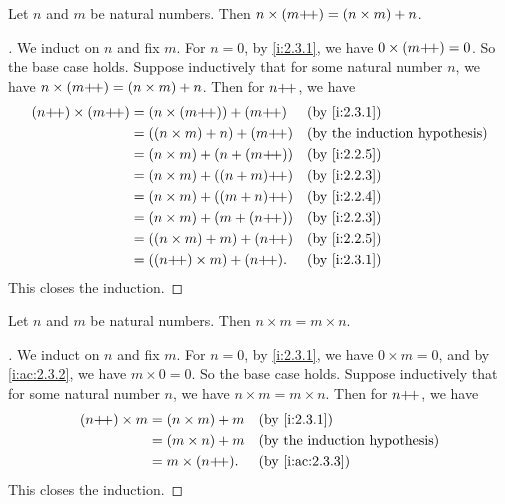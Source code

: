 \begin{ac}\label{i:ac:2.3.3}
  Let \(n\) and \(m\) be natural numbers.
  Then \(n \times (m{+}\!{+}) = (n \times m) + n\).
\end{ac}

\begin{proof}[]
  We induct on \(n\) and fix \(m\).
  For \(n = 0\), by \cref{i:2.3.1}, we have \(0 \times (m{+}\!{+}) = 0\).
  So the base case holds.
  Suppose inductively that for some natural number \(n\), we have \(n \times (m{+}\!{+}) = (n \times m) + n\).
  Then for \(n{+}\!{+}\), we have
  \begin{align*}
    (n\pp) \times (m\pp)
     & = (n \times (m\pp)) + (m\pp)  &  & \by{i:2.3.1} \\
     & = ((n \times m) + n) + (m\pp) &  & \byIH        \\
     & = (n \times m) + (n + (m\pp)) &  & \by{i:2.2.5} \\
     & = (n \times m) + ((n + m)\pp) &  & \by{i:2.2.3} \\
     & = (n \times m) + ((m + n)\pp) &  & \by{i:2.2.4} \\
     & = (n \times m) + (m + (n\pp)) &  & \by{i:2.2.3} \\
     & = ((n \times m) + m) + (n\pp) &  & \by{i:2.2.5} \\
     & = ((n\pp) \times m) + (n\pp). &  & \by{i:2.3.1}
  \end{align*}
  This closes the induction.
\end{proof}

\begin{lem}\label{i:2.3.2}
  Let \(n\) and \(m\) be natural numbers.
  Then \(n \times m = m \times n\).
\end{lem}

\begin{proof}[]
  We induct on \(n\) and fix \(m\).
  For \(n = 0\), by \cref{i:2.3.1}, we have \(0 \times m = 0\), and by \cref{i:ac:2.3.2}, we have \(m \times 0 = 0\).
  So the base case holds.
  Suppose inductively that for some natural number \(n\), we have \(n \times m = m \times n\).
  Then for \(n{+}\!{+}\), we have
  \begin{align*}
    (n\pp) \times m & = (n \times m) + m &  & \by{i:2.3.1}    \\
                    & = (m \times n) + m &  & \byIH           \\
                    & = m \times (n\pp). &  & \by{i:ac:2.3.3}
  \end{align*}
  This closes the induction.
\end{proof}

